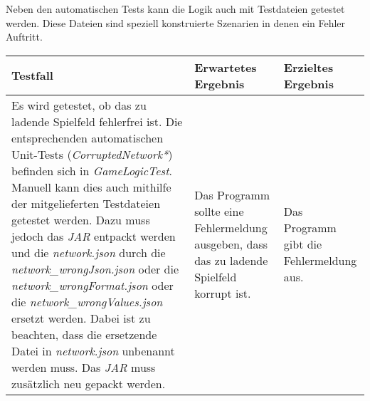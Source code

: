     
    Neben den automatischen Tests kann die Logik auch mit Testdateien getestet werden.
    Diese Dateien sind speziell konstruierte Szenarien in denen ein Fehler Auftritt.
    
    \begin{table}[H]
        \caption{Spielfeld Tests}
        \begin{longtable}{p{6cm} p{4cm} p{2cm}} 
            \hline
            \textbf{Testfall} & \textbf{Erwartetes Ergebnis} & \textbf{Erzieltes Ergebnis}\\
            \hline
            Es wird getestet, ob das zu ladende Spielfeld fehlerfrei ist.
            Die entsprechenden automatischen Unit-Tests (\textit{CorruptedNetwork*}) befinden sich in \textit{GameLogicTest}.
            Manuell kann dies auch mithilfe der mitgelieferten Testdateien getestet werden.
            Dazu muss jedoch das \textit{JAR} entpackt werden und die \textit{network.json} durch die
            \textit{network\_wrongJson.json} oder die \textit{network\_wrongFormat.json} oder die
            \textit{network\_wrongValues.json} ersetzt werden. Dabei ist zu beachten, dass die ersetzende Datei in \textit{network.json}
            unbenannt werden muss. Das \textit{JAR} muss zusätzlich neu gepackt werden.
            &
            Das Programm sollte eine Fehlermeldung ausgeben, dass das zu ladende Spielfeld korrupt ist.
            &
            Das Programm gibt die Fehlermeldung aus.
            \\
            \hline
        \end{longtable}
    \end{table}

